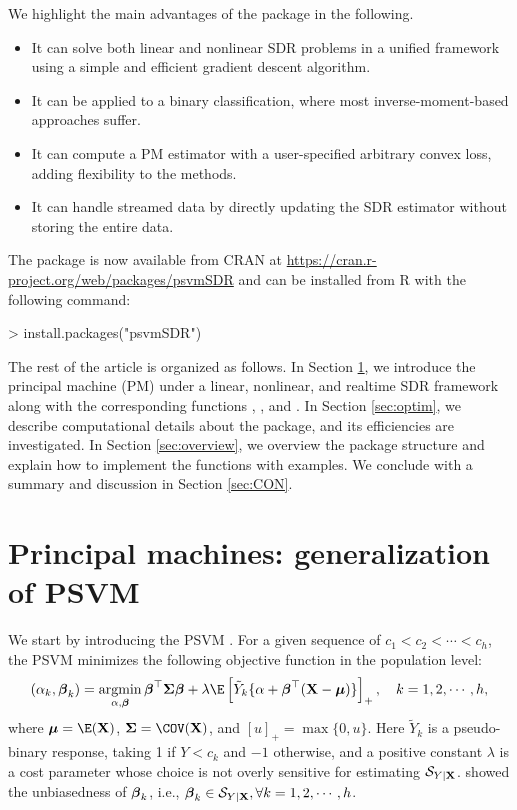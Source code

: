 We highlight the main advantages of the package  in the following.
\begin{itemize}
\item It can solve both linear and nonlinear SDR problems in a unified framework using a simple and efficient gradient descent algorithm. 
\item It can be applied to a binary classification, where most inverse-moment-based approaches suffer.
\item It can compute a PM estimator with a user-specified arbitrary convex loss, adding flexibility to the methods. 
\item  It can handle streamed data by directly updating the SDR estimator without storing the entire data.  
\end{itemize}
The package is now available from CRAN at \url{https://cran.r-project.org/web/packages/psvmSDR} and can be installed from R with the following command:
\begin{example}
 > install.packages("psvmSDR")
\end{example}

The rest of the article is organized as follows. In Section \ref{sec:PSDR}, we introduce the principal machine (PM) under a linear,  nonlinear, and realtime SDR framework along with the corresponding functions , , and . In Section \ref{sec:optim}, we describe computational details about the package, and its efficiencies are investigated. In Section \ref{sec:overview}, we overview the package structure and explain how to implement the functions with examples. We conclude with a summary and discussion in Section \ref{sec:CON}.

\section{Principal machines: generalization of PSVM} \label{sec:PSDR}

We start by introducing the PSVM \citep{Li2011::psvm}. For a given sequence of $c_1 < c_2 < \cdots < c_h$, the PSVM minimizes the following objective function in the population level: 
\begin{equation} \label{eqn:model}
    (\alpha_{k}, \bbeta_{k}) = \argmin_{\alpha, \bbeta} \bbeta^{\top} \bSigma \bbeta + \lambda \E \left[\tilde{Y}_k \{\alpha + \bbeta^{\top} (\bX - \bmu)\}\right]_+, \quad k = 1, 2, \cdots, h,
\end{equation}
where $\bmu = \E(\bX)$, $\bSigma = \COV(\bX)$, and $[u]_+ = \max\{0, u\}$. Here $\tilde{Y}_{k}$ is a pseudo-binary response, taking 1 if $Y < c_k$ and $-1$ otherwise, and a positive constant $\lambda$ is a cost parameter whose choice is not overly sensitive for estimating $\mathcal{S}_{Y\mid \mathbf{X}}$. \citet{Li2011::psvm} showed the unbiasedness of $\boldsymbol{\beta}_{k}$, i.e., $\boldsymbol{\beta}_{k} \in \mathcal{S}_{Y\mid \mathbf{X}}, \forall k = 1, 2, \cdots, h$.  

